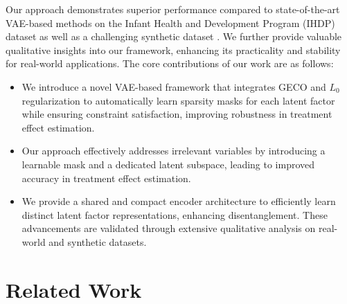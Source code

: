 \documentclass[doubleblind]{ecai}
\begin{document}
	Our approach demonstrates superior performance compared to state-of-the-art VAE-based methods on the Infant Health and Development Program (IHDP) dataset as well as a challenging synthetic dataset \citep{Gunn,Hill,Khan2024OnTE}. We further provide valuable qualitative insights into our framework, enhancing its practicality and stability for real-world applications. 
	The core contributions of our work are as follows:
	\begin{itemize}
		\item We introduce a novel VAE-based framework that integrates GECO and $L_0$ regularization to automatically learn sparsity masks for each latent factor while ensuring constraint satisfaction, improving robustness in treatment effect estimation.
		
		\item Our approach effectively addresses irrelevant variables by introducing a learnable mask and a dedicated latent subspace, leading to improved accuracy in treatment effect estimation.
		
		\item We provide a shared and compact encoder architecture to efficiently learn distinct latent factor representations, enhancing disentanglement. These advancements are validated through extensive qualitative analysis on real-world and synthetic datasets.
		
		
		
	\end{itemize}
	
	
	
	
	\section{Related Work}
	\label{sec:related-work}
	
		
		
		
		
	
\end{document}
